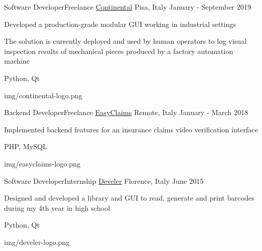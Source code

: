 \begin{cventries}
  \logocventry
    {Software Developer{\enskip\cdotp\enskip}Freelance}
    {\href{https://www.continental-pneumatici.it/auto}{Continental}}
    {Pisa, Italy}
    {January - September 2019}
    {
      \begin{cvitems}
        \item {Developed a production-grade modular GUI working in industrial settings}
        \item {The solution is currently deployed and used by human operators to log visual inspection results of mechanical pieces produced by a factory automation machine}
      \end{cvitems}
      \cvexptech
        {Python, Qt}
    }
    {img/continental-logo.png}

  \logocventry
    {Backend Developer{\enskip\cdotp\enskip}Freelance}
    {\href{https://www.easyclaims.eu}{EasyClaims}}
    {Remote, Italy}
    {January - March 2018}
    {
      \begin{cvitems}
        \item {Implemented backend features for an insurance claims video verification interface}
      \end{cvitems}
      \cvexptech
        {PHP, MySQL}
    }
    {img/easyclaims-logo.png}

  \logocventry
    {Software Developer{\enskip\cdotp\enskip}Internship}
    {\href{https://www.develer.com/}{Develer}}
    {Florence, Italy}
    {June 2015}
    {
    \begin{cvitems}
      \item {Designed and developed a library and GUI to read, generate and print barcodes during my 4th year in high school}
    \end{cvitems}
    \cvexptech
      {Python, Qt}
    }
    {img/develer-logo.png}

\end{cventries}